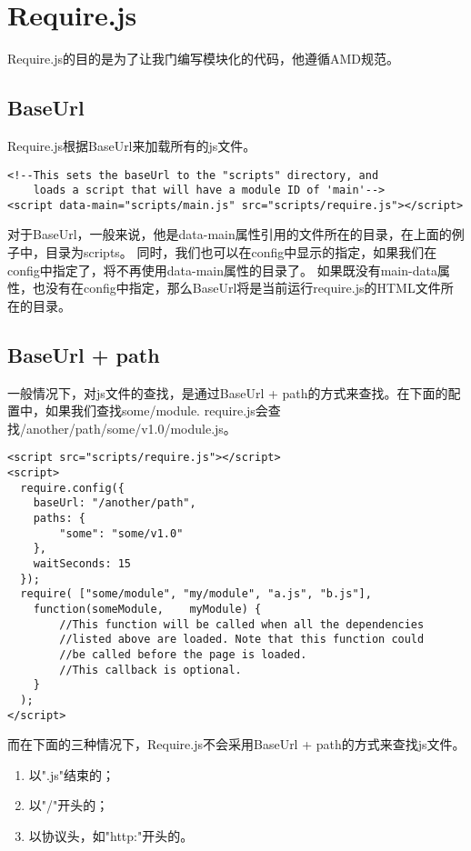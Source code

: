 \section{Require.js}
    Require.js的目的是为了让我门编写模块化的代码，他遵循AMD规范。

    \subsection{BaseUrl}
    Require.js根据BaseUrl来加载所有的js文件。

    \begin{lstlisting}
<!--This sets the baseUrl to the "scripts" directory, and
    loads a script that will have a module ID of 'main'-->
<script data-main="scripts/main.js" src="scripts/require.js"></script>
    \end{lstlisting}

    对于BaseUrl，一般来说，他是data-main属性引用的文件所在的目录，在上面的例子中，目录为scripts。
    同时，我们也可以在config中显示的指定，如果我们在config中指定了，将不再使用data-main属性的目录了。
    如果既没有main-data属性，也没有在config中指定，那么BaseUrl将是当前运行require.js的HTML文件所在的目录。

    \subsection{BaseUrl + path}
    一般情况下，对js文件的查找，是通过BaseUrl + path的方式来查找。在下面的配置中，如果我们查找some/module.
    require.js会查找/another/path/some/v1.0/module.js。
    \begin{lstlisting}
<script src="scripts/require.js"></script>
<script>
  require.config({
    baseUrl: "/another/path",
    paths: {
        "some": "some/v1.0"
    },
    waitSeconds: 15
  });
  require( ["some/module", "my/module", "a.js", "b.js"],
    function(someModule,    myModule) {
        //This function will be called when all the dependencies
        //listed above are loaded. Note that this function could
        //be called before the page is loaded.
        //This callback is optional.
    }
  );
</script>
    \end{lstlisting}

    而在下面的三种情况下，Require.js不会采用BaseUrl + path的方式来查找js文件。
    \begin{enumerate}
    \item 以".js"结束的；
    \item 以"/"开头的；
    \item 以协议头，如"http:"开头的。
    \end{enumerate}

